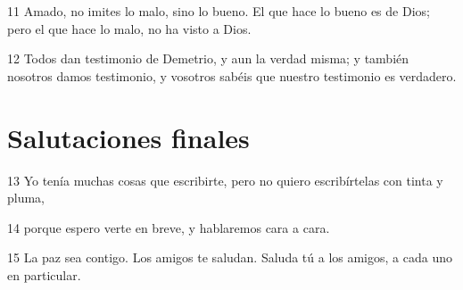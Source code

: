 \par 11 Amado, no imites lo malo, sino lo bueno. El que hace lo bueno es de Dios; pero el que hace lo malo, no ha visto a Dios.
\par 12 Todos dan testimonio de Demetrio, y aun la verdad misma; y también nosotros damos testimonio, y vosotros sabéis que nuestro testimonio es verdadero.

\section*{Salutaciones finales}

\par 13 Yo tenía muchas cosas que escribirte, pero no quiero escribírtelas con tinta y pluma,
\par 14 porque espero verte en breve, y hablaremos cara a cara.
\par 15 La paz sea contigo. Los amigos te saludan. Saluda tú a los amigos, a cada uno en particular.


